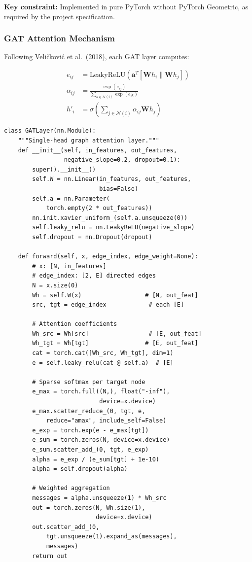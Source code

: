 \documentclass[12pt,a4paper]{article}
\begin{document}
\textbf{Key constraint:} Implemented in pure PyTorch without PyTorch Geometric, as required by the project specification.

\subsubsection{GAT Attention Mechanism}

Following Veli\v{c}kovi\'c et al.\ (2018), each GAT layer computes:

\begin{align}
    e_{ij} &= \text{LeakyReLU}\left(\mathbf{a}^T [\mathbf{W}h_i \| \mathbf{W}h_j]\right) \\
    \alpha_{ij} &= \frac{\exp(e_{ij})}{\sum_{k \in \mathcal{N}(i)} \exp(e_{ik})} \\
    h'_i &= \sigma\left(\sum_{j \in \mathcal{N}(i)} \alpha_{ij} \mathbf{W} h_j\right)
\end{align}

\begin{lstlisting}[caption={Custom GAT layer (src/models/gat\_model.py)}]
class GATLayer(nn.Module):
    """Single-head graph attention layer."""
    def __init__(self, in_features, out_features,
                 negative_slope=0.2, dropout=0.1):
        super().__init__()
        self.W = nn.Linear(in_features, out_features,
                           bias=False)
        self.a = nn.Parameter(
            torch.empty(2 * out_features))
        nn.init.xavier_uniform_(self.a.unsqueeze(0))
        self.leaky_relu = nn.LeakyReLU(negative_slope)
        self.dropout = nn.Dropout(dropout)

    def forward(self, x, edge_index, edge_weight=None):
        # x: [N, in_features]
        # edge_index: [2, E] directed edges
        N = x.size(0)
        Wh = self.W(x)                  # [N, out_feat]
        src, tgt = edge_index            # each [E]

        # Attention coefficients
        Wh_src = Wh[src]                 # [E, out_feat]
        Wh_tgt = Wh[tgt]                # [E, out_feat]
        cat = torch.cat([Wh_src, Wh_tgt], dim=1)
        e = self.leaky_relu(cat @ self.a)  # [E]

        # Sparse softmax per target node
        e_max = torch.full((N,), float("-inf"),
                           device=x.device)
        e_max.scatter_reduce_(0, tgt, e,
            reduce="amax", include_self=False)
        e_exp = torch.exp(e - e_max[tgt])
        e_sum = torch.zeros(N, device=x.device)
        e_sum.scatter_add_(0, tgt, e_exp)
        alpha = e_exp / (e_sum[tgt] + 1e-10)
        alpha = self.dropout(alpha)

        # Weighted aggregation
        messages = alpha.unsqueeze(1) * Wh_src
        out = torch.zeros(N, Wh.size(1),
                          device=x.device)
        out.scatter_add_(0,
            tgt.unsqueeze(1).expand_as(messages),
            messages)
        return out
\end{lstlisting}
\end{document}
